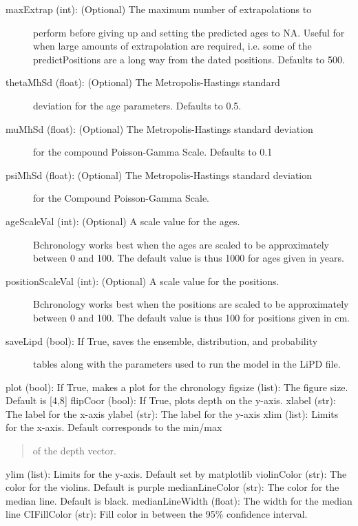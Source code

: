 \documentclass[letterpaper,10pt,english]{sphinxmanual}
\begin{document}
\begin{fulllineitems}
\begin{description}
\begin{description}
\item[{maxExtrap (int): (Optional) The maximum number of extrapolations to}] \leavevmode
perform before giving up and setting the predicted ages to NA.
Useful for when large amounts of extrapolation are required, i.e.
some of the predictPositions are a long way from the dated
positions. Defaults to 500.

\item[{thetaMhSd (float):  (Optional)  The Metropolis-Hastings standard}] \leavevmode
deviation for the age parameters. Defaults to 0.5.

\item[{muMhSd (float): (Optional)  The Metropolis-Hastings standard deviation}] \leavevmode
for the compound Poisson-Gamma Scale. Defaults to 0.1

\item[{psiMhSd (float): (Optional) The Metropolis-Hastings standard deviation}] \leavevmode
for the Compound Poisson-Gamma Scale.

\item[{ageScaleVal (int): (Optional) A scale value for the ages.}] \leavevmode
Bchronology works best when the ages are scaled to be
approximately between 0 and 100.
The default value is thus 1000 for ages given in years.

\item[{positionScaleVal (int):  (Optional) A scale value for the positions.}] \leavevmode
Bchronology works best when the positions are scaled to be
approximately between 0 and 100. The default value is thus
100 for positions given in cm.

\item[{saveLipd (bool): If True, saves the ensemble, distribution, and probability}] \leavevmode
tables along with the parameters used to run the model in the LiPD
file.

\end{description}

plot (bool): If True, makes a plot for the chronology
figsize (list): The figure size. Default is {[}4,8{]}
flipCoor (bool): If True, plots depth on the y-axis.
xlabel (str): The label for the x-axis
ylabel (str): The label for the y-axis
xlim (list): Limits for the x-axis. Default corresponds to the min/max
\begin{quote}

of the depth vector.
\end{quote}

ylim (list): Limits for the y-axis. Default set by matplotlib
violinColor (str): The color for the violins. Default is purple
medianLineColor (str): The color for the median line. Default is black.
medianLineWidth (float): The width for the median line
CIFillColor (str): Fill color in between the 95\% confidence interval.
\begin{quote}


\end{quote}
\end{description}
\end{fulllineitems}
\end{document}
